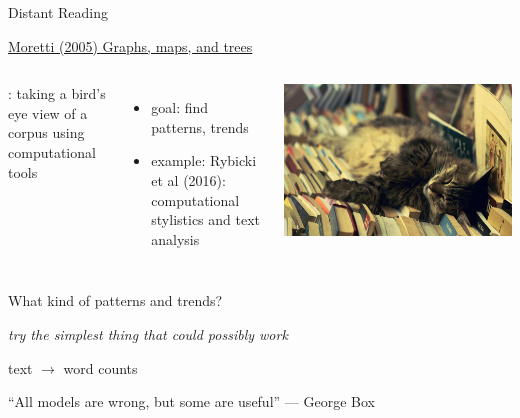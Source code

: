 \documentclass[aspectratio=169,usenames,dvipsnames]{beamer}
\begin{document}
\begin{frame}{Distant Reading}
\begin{reference}
\href{https://www.versobooks.com/books/261-graphs-maps-trees}{
Moretti (2005) Graphs, maps, and trees}

\end{reference}
\begin{columns}
        \begin{definition}
        :
        taking a bird's eye view of a corpus using computational tools
        \end{definition}
    \begin{itemize}
        \item goal: find patterns, trends
        \pause
        \item example: Rybicki et al (2016): computational stylistics and text analysis
    \end{itemize}
    \onslide
    \includegraphics[width=\linewidth]{fig/catbooks.jpg}
\end{columns}
\end{frame}


\begin{frame}{What kind of patterns and trends?}

	\pause
	\emph{try the simplest thing that could possibly work}\texttrademark

	\pause
	\vspace{2em}
	\centering
	text $\rightarrow$ word counts

    \pause
    \vspace{2em}
    ``All models are wrong, but some are useful'' --- George Box
\end{frame}
\end{document}
